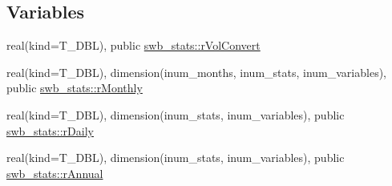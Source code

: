 \subsection*{Variables}
\begin{DoxyCompactItemize}
\item 
real(kind=T\_\-DBL), public \hyperlink{namespaceswb__stats_aa4fd347bb81a4fdd52833b87d790de52}{swb\_\-stats::rVolConvert}
\item 
real(kind=T\_\-DBL), dimension(inum\_\-months, inum\_\-stats, inum\_\-variables), public \hyperlink{namespaceswb__stats_a0b1c5339981acd4006223df2a21f1670}{swb\_\-stats::rMonthly}
\item 
real(kind=T\_\-DBL), dimension(inum\_\-stats, inum\_\-variables), public \hyperlink{namespaceswb__stats_a8f4ae0971c0286e171999202b9e5b07f}{swb\_\-stats::rDaily}
\item 
real(kind=T\_\-DBL), dimension(inum\_\-stats, inum\_\-variables), public \hyperlink{namespaceswb__stats_a6844e1ec4a1276cc97060f800570f8fd}{swb\_\-stats::rAnnual}
\end{DoxyCompactItemize}
